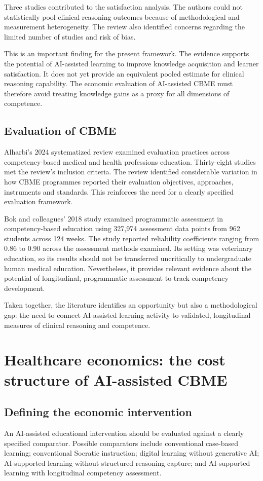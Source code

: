 \documentclass[11pt,a4paper]{article}
\begin{document}
Three studies contributed to the satisfaction analysis. The authors could not statistically pool clinical reasoning outcomes because of methodological and measurement heterogeneity. The review also identified concerns regarding the limited number of studies and risk of bias.

This is an important finding for the present framework. The evidence supports the potential of AI-assisted learning to improve knowledge acquisition and learner satisfaction. It does not yet provide an equivalent pooled estimate for clinical reasoning capability. The economic evaluation of AI-assisted CBME must therefore avoid treating knowledge gains as a proxy for all dimensions of competence.

\subsection{Evaluation of CBME}
Alharbi's 2024 systematized review examined evaluation practices across competency-based medical and health professions education. Thirty-eight studies met the review's inclusion criteria. The review identified considerable variation in how CBME programmes reported their evaluation objectives, approaches, instruments and standards. This reinforces the need for a clearly specified evaluation framework.

Bok and colleagues' 2018 study examined programmatic assessment in competency-based education using 327,974 assessment data points from 962 students across 124 weeks. The study reported reliability coefficients ranging from 0.86 to 0.90 across the assessment methods examined. Its setting was veterinary education, so its results should not be transferred uncritically to undergraduate human medical education. Nevertheless, it provides relevant evidence about the potential of longitudinal, programmatic assessment to track competency development.

Taken together, the literature identifies an opportunity but also a methodological gap: the need to connect AI-assisted learning activity to validated, longitudinal measures of clinical reasoning and competence.

\section{Healthcare economics: the cost structure of AI-assisted CBME}
\subsection{Defining the economic intervention}
An AI-assisted educational intervention should be evaluated against a clearly specified comparator. Possible comparators include conventional case-based learning; conventional Socratic instruction; digital learning without generative AI; AI-supported learning without structured reasoning capture; and AI-supported learning with longitudinal competency assessment.
\end{document}
